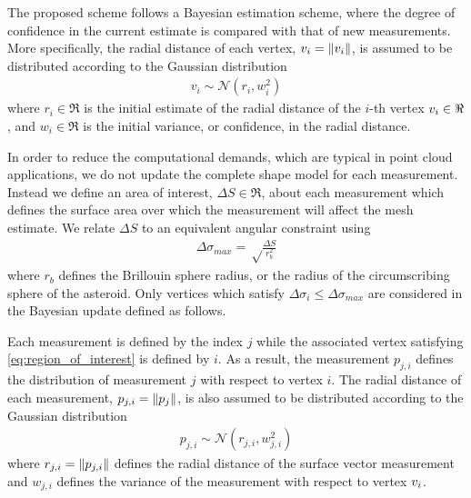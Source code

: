 \documentclass[journal]{new-aiaa}
\begin{document}
The proposed scheme follows a Bayesian estimation scheme, where the degree of confidence in the current estimate is compared with that of new measurements. 
More specifically, the radial distance of each vertex, \( v_i = \left\| v_i \right\|\), is assumed to be distributed according to the Gaussian distribution
\begin{align*}
    v_i \sim \mathcal{N}(r_i, w_i^2)
\end{align*}
where \( r_i\in\Re \) is the initial estimate of the radial distance of the $i$-th vertex \( v_i\in\Re\), and \( w_i\in\Re \) is the initial variance, or confidence, in the radial distance.

In order to reduce the computational demands, which are typical in point cloud applications, we do not update the complete shape model for each measurement.
Instead we define an area of interest, \( \Delta S\in\Re \), about each measurement which defines the surface area over which the measurement will affect the mesh estimate.
We relate \( \Delta S \) to an equivalent angular constraint using
\begin{align}\label{eq:region_of_interest}
    \Delta \sigma_{max} = \sqrt \frac{\Delta S}{r_b^2}
\end{align}
where \( r_b \) defines the Brillouin  sphere radius, or the radius of the circumscribing sphere of the asteroid.
Only vertices which satisfy \( \Delta \sigma_i \leq \Delta \sigma_{max} \) are considered in the Bayesian update defined as follows.

Each measurement is defined by the index \( j \) while the associated vertex satisfying \cref{eq:region_of_interest} is defined by \( i \). 
As a result, the measurement \( p_{j, i} \) defines the distribution of measurement \( j \) with respect to vertex \( i \). 
The radial distance of each measurement, \( p_{j,i} = \left\| p_j \right\|\), is also assumed to be distributed according to the Gaussian distribution
\begin{align*}
    p_{j,i} \sim \mathcal{N}(r_{j,i}, w_{j,i}^2)
\end{align*}
where \( r_{j,i} = \left\| p_{j,i} \right\| \) defines the radial distance of the surface vector measurement and \( w_{j, i}\) defines the variance of the measurement with respect to vertex \( v_i\).
\end{document}
